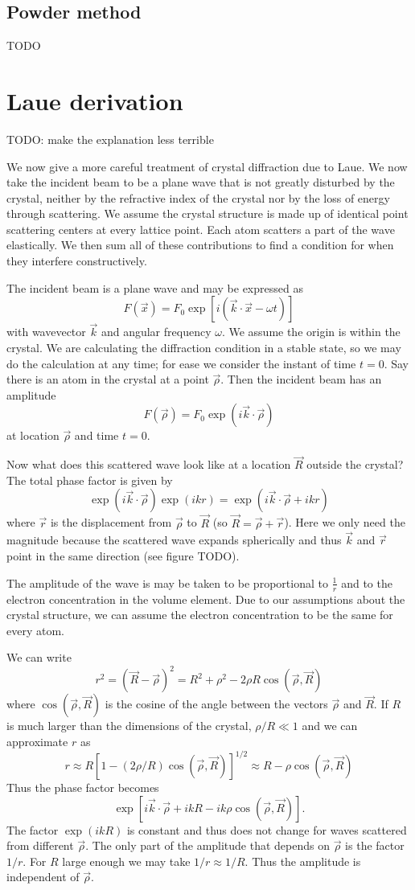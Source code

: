 \subsection{Powder method}
TODO
\section{Laue derivation}
TODO: make the explanation less terrible

We now give a more careful treatment of crystal diffraction due to Laue. We now take the incident beam to be a plane wave that is not greatly disturbed by the crystal, neither by the refractive index of the crystal nor by the loss of energy through scattering. We assume the crystal structure is made up of identical point scattering centers at every lattice point. Each atom scatters a part of the wave elastically. We then sum all of these contributions to find a condition for when they interfere constructively.


The incident beam is a plane wave and may be expressed as
\[ F(\vec{x}) = F_0 \exp[i(\vec{k}\cdot \vec{x} - \omega t)] \]
with wavevector $\vec{k}$ and angular frequency $\omega$. We assume the origin is within the crystal.
We are calculating the diffraction condition in a stable state, so we may do the calculation at any time; for ease we consider the instant of time $t=0$. Say there is an atom in the crystal at a point $\vec{\rho}$. Then the incident beam has an amplitude
\[ F(\vec{\rho}) = F_0 \exp(i \vec{k}\cdot \vec{\rho}) \]
at location $\vec{\rho}$ and time $t=0$.

Now what does this scattered wave look like at a location $\vec{R}$ outside the crystal? The total phase factor is given by
\[ \exp(i \vec{k}\cdot \vec{\rho}) \exp(ikr) = \exp(i \vec{k}\cdot \vec{\rho} + ikr) \]
where $\vec{r}$ is the displacement from $\vec{\rho}$ to $\vec{R}$ (so $\vec{R} = \vec{\rho} + \vec{r}$). Here we only need the magnitude because the scattered wave expands spherically and thus $\vec{k}$ and $\vec{r}$ point in the same direction (see figure TODO).

The amplitude of the wave is may be taken to be proportional to $\frac{1}{r}$ and to the electron concentration in the volume element. Due to our assumptions about the crystal structure, we can assume the electron concentration to be the same for every atom.

We can write
\[ r^2 = (\vec{R} - \vec{\rho})^2 = R^2 + \rho^2 - 2\rho R \cos(\vec{\rho}, \vec{R}) \]
where $\cos(\vec{\rho}, \vec{R})$ is the cosine of the angle between the vectors $\vec{\rho}$ and $\vec{R}$.
If $R$ is much larger than the dimensions of the crystal, $\rho/R \ll 1$ and we can approximate $r$ as
\[ r \approx R[1-(2\rho / R)\cos(\vec{\rho}, \vec{R})]^{1/2} \approx R - \rho \cos(\vec{\rho}, \vec{R}) \]
Thus the phase factor becomes
\[ \exp[i \vec{k}\cdot \vec{\rho} + ikR - ik\rho\cos (\vec{\rho}, \vec{R})]. \]
The factor $\exp(ikR)$ is constant and thus does not change for waves scattered from different $\vec{\rho}$. The only part of the amplitude that depends on $\vec{\rho}$ is the factor $1/r$. For $R$ large enough we may take $1/r \approx 1/R$. Thus the amplitude is independent of $\vec{\rho}$.

